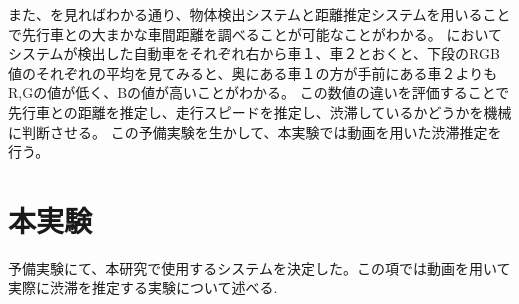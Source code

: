 また、を見ればわかる通り、物体検出システムと距離推定システムを用いることで先行車との大まかな車間距離を調べることが可能なことがわかる。
においてシステムが検出した自動車をそれぞれ右から車１、車２とおくと、下段のRGB値のそれぞれの平均を見てみると、奥にある車１の方が手前にある車２よりもR,Gの値が低く、Bの値が高いことがわかる。
この数値の違いを評価することで先行車との距離を推定し、走行スピードを推定し、渋滞しているかどうかを機械に判断させる。
この予備実験を生かして、本実験では動画を用いた渋滞推定を行う。

\section{本実験}
予備実験にて、本研究で使用するシステムを決定した。この項では動画を用いて実際に渋滞を推定する実験について述べる.